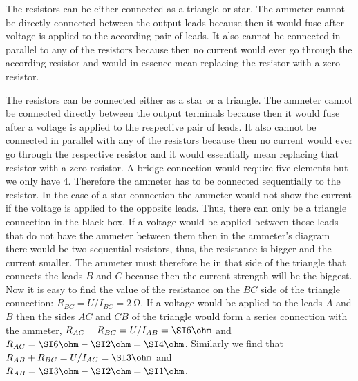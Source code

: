 \hinteng
The resistors can be either connected as a triangle or star. The ammeter cannot be directly connected between the output leads because then it would fuse after voltage is applied to the according pair of leads. It also cannot be connected in parallel to any of the resistors because then no current would ever go through the according resistor and would in essence mean replacing the resistor with a zero-resistor.

\solueng
The resistors can be connected either as a star or a triangle. The ammeter cannot be connected directly between the output terminals because then it would fuse after a voltage is applied to the respective pair of leads. It also cannot be connected in parallel with any of the resistors because then no current would ever go through the respective resistor and it would essentially mean replacing that resistor with a zero-resistor. A bridge connection would require five elements but we only have 4. Therefore the ammeter has to be connected sequentially to the resistor. In the case of a star connection the ammeter would not show the current if the voltage is applied to the opposite leads. Thus, there can only be a triangle connection in the black box. If a voltage would be applied between those leads that do not have the ammeter between them then in the ammeter’s diagram there would be two sequential resistors, thus, the resistance is bigger and the current smaller. The ammeter must therefore be in that side of the triangle that connects the leads $B$ and $C$ because then the current strength will be the biggest. Now it is easy to find the value of the resistance on the $BC$ side of the triangle connection: $R_{BC}=U/I_{BC}=\SI{2}{\ohm}$. If a voltage would be applied to the leads $A$ and $B$ then the sides $AC$ and $CB$ of the triangle would form a series connection with the ammeter, $R_{AC}+R_{BC}=U/I_{AB}=\SI 6\ohm$ and $R_{AC}=\SI 6\ohm-\SI 2\ohm=\SI 4\ohm$. Similarly we find that $R_{AB}+R_{BC}=U/I_{AC}=\SI 3\ohm$ and $R_{AB}=\SI 3\ohm-\SI 2\ohm=\SI 1\ohm$.
\probend